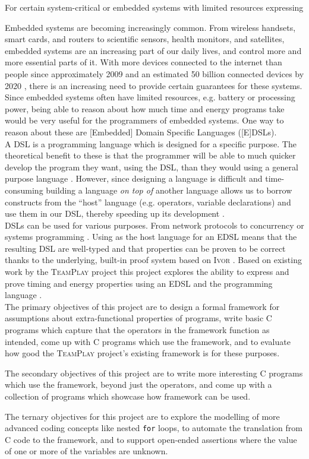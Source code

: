 For certain system-critical or embedded systems with limited resources expressing

Embedded systems are becoming increasingly common. From wireless handsets, smart cards, and routers to scientific sensors, health monitors, and satellites, embedded systems are an increasing part of our daily lives, and control more and more essential parts of it. With more devices connected to the internet than people since approximately 2009 and an estimated 50 billion connected devices by 2020 \cite{cisco-whitepaper}, there is an increasing need to provide certain guarantees for these systems. Since embedded systems often have limited resources, e.g. battery or processing power, being able to reason about how much time and energy programs take would be very useful for the programmers of embedded systems. One way to reason about these are [Embedded] Domain Specific Languages ([E]DSLs).
\\

A DSL is a programming language which is designed for a specific purpose. The theoretical benefit to these is that the programmer will be able to much quicker develop the program they want, using the DSL, than they would using a general purpose language \cite{685738}. However, since designing a language is difficult and time-consuming building a language \textit{on top of} another language allows us to borrow constructs from the ``host'' language (e.g. operators, variable declarations) and use them in our DSL, thereby speeding up its development \cite{hudak1996building}.
\\

DSLs can be used for various purposes. From network protocols \cite{5158855} to concurrency or systems programming \cite{brady2010correct,10.1007/978-3-642-27694-1_18}. Using \Idris as the host language for an EDSL means that the resulting DSL are well-typed and that properties can be proven to be correct thanks to the underlying, built-in proof system based on \textsc{Ivor} \cite{10.1007/978-3-540-74130-5_9,brady_2013}. Based on existing work by the \textsc{TeamPlay} project \cite{teamplay:d1.1} this project explores the ability to express and prove timing and energy properties using an EDSL and the \Idris programming language \cite{brady_2013}.
\\

The primary objectives of this project are to design a formal framework for assumptions about extra-functional properties of programs, write basic C programs which capture that the operators in the framework function as intended, come up with C programs which use the framework, and to evaluate how good the \textsc{TeamPlay} project's existing framework is for these purposes.

The secondary objectives of this project are to write more interesting C programs which use the framework, beyond just the operators, and come up with a collection of programs which showcase how framework can be used.

The ternary objectives for this project are to explore the modelling of more advanced coding concepts like nested \texttt{for} loops, to automate the translation from C code to the framework, and to support open-ended assertions where the value of one or more of the variables are unknown.
